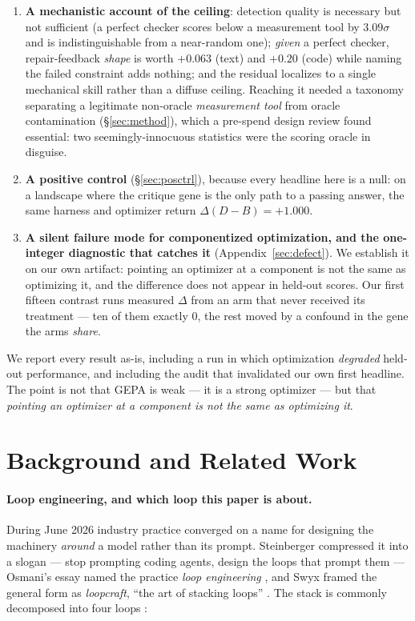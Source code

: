 \documentclass[11pt]{article}
\newcommand{\dd}{\ensuremath{\Delta}}
\begin{document}
\begin{enumerate}
    contributes $+0.002$, not the deficit.
  \item \textbf{A mechanistic account of the ceiling}: detection quality is necessary but not
    sufficient (a perfect checker scores below a measurement tool by $3.09\sigma$ and is
    indistinguishable from a near-random one); \emph{given} a perfect
    checker, repair-feedback \emph{shape} is worth $+0.063$ (text) and $+0.20$ (code) while
    naming the failed constraint adds nothing; and the residual localizes to a single
    mechanical skill rather than a diffuse ceiling. Reaching it needed a taxonomy separating a
    legitimate non-oracle \emph{measurement tool} from oracle contamination
    (\S\ref{sec:method}), which a pre-spend design review found essential: two
    seemingly-innocuous statistics were the scoring oracle in disguise.
  \item \textbf{A positive control} (\S\ref{sec:posctrl}), because every headline here is a
    null: on a landscape where the critique gene is the only path to a passing answer, the
    same harness and optimizer return $\dd(D-B) = +1.000$.
  \item \textbf{A silent failure mode for componentized optimization, and the one-integer
    diagnostic that catches it} (Appendix~\ref{sec:defect}). We establish it on our own
    artifact: pointing an optimizer at a component is not the same as optimizing it, and the
    difference does not appear in held-out scores. Our first fifteen contrast runs measured
    $\dd$ from an arm that never received its treatment --- ten of them exactly $0$, the rest
    moved by a confound in the gene the arms \emph{share}.
\end{enumerate}

We report every result as-is, including a run in which optimization \emph{degraded} held-out
performance, and including the audit that invalidated our own first headline. The point is not
that GEPA is weak --- it is a strong optimizer --- but that \emph{pointing an optimizer at a
component is not the same as optimizing it}.
\section{Background and Related Work}
\label{sec:related}

\paragraph{Loop engineering, and which loop this paper is about.}
During June 2026 industry practice converged on a name for designing the machinery
\emph{around} a model rather than its prompt. Steinberger compressed it into a slogan ---
stop prompting coding agents, design the loops that prompt them
\citep{steinberger2026loops} --- Osmani's essay named the practice \emph{loop engineering}
\citep{osmani2026loop}, and Swyx framed the general form as \emph{loopcraft}, ``the art of
stacking loops'' \citep{swyx2026loopcraft}. The stack is commonly decomposed into four
loops \citep{langchain2026loopcraft}:
\end{document}
